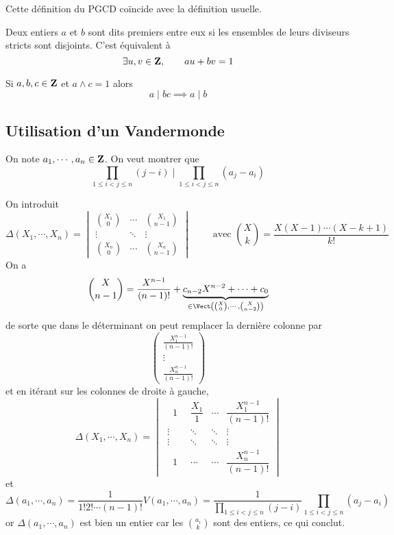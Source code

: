 \begin{rem}
    Cette définition du PGCD coïncide avec la définition usuelle.
\end{rem}

\begin{thmdef}
    Deux entiers $a$ et $b$ sont dits premiers entre eux si les ensembles de leurs diviseurs stricts sont disjoints. C'est équivalent à \[
        \exists u, v\in\mathbf Z, \qquad au+bv=1
    \]
\end{thmdef}

\begin{thm}
     Si $a, b, c\in \mathbf Z$ et $a\land c=1$ alors \[
        a\;|\;bc\implies a\;|\; b
    \]
\end{thm}

\subsection{Utilisation d'un Vandermonde}

On note $a_1, \cdots, a_n\in\mathbf Z$. On veut montrer que \[
    \prod_{1\leq i<j\leq n}(j-i)\;\Big|\; \prod_{1\leq i<j\leq n}(a_j-a_i)
\]

On introduit \[
    \Delta(X_1, \cdots, X_n)= \begin{vmatrix}
        \binom{X_1}0 & \cdots & \binom{X_1}{n-1} \\
        \vdots & \ddots & \vdots \\
        \binom{X_n}0 & \cdots & \binom{X_n}{n-1}
    \end{vmatrix}\qquad \text{ avec }\binom Xk=\frac{X(X-1)\cdots (X-k+1)}{k!}
\]
On a \[
    \binom X{n-1}=\frac{X^{n-1}}{(n-1)!}+\underbrace{c_{n-2}X^{n-2}+\cdots +c_0}_{\in \Vect \left( \binom X0, \cdots, \binom X{n-2} \right)}
\]
de sorte que dans le déterminant on peut remplacer la dernière colonne par \[
    \begin{pmatrix}
        \frac{X_1^{n-1}}{(n-1)!} \\
        \vdots \\
        \frac{X_n^{n-1}}{(n-1)!}
    \end{pmatrix}
\]
et en itérant sur les colonnes de droite à gauche, \[
    \Delta(X_1, \cdots, X_n)= \begin{vmatrix}
        \;\;\;1\;\; & \dfrac{X_1}1 & \cdots & \dfrac{X_1^{n-1}}{(n-1)!} \\
        \;\vdots & \ddots & \ddots & \vdots \\
        \;\vdots & \ddots & \ddots & \vdots \\
        \;\;\;1\;\; & \cdots & \cdots & \dfrac{X_n^{n-1}}{(n-1)!}
    \end{vmatrix}
\]
et \[
    \Delta(a_1, \cdots, a_n)=\frac1{1!2!\cdots (n-1)!}V(a_1, \cdots, a_n)=\frac1{\prod_{1\leq i<j\leq n}(j-i)}\prod_{1\leq i<j\leq n}(a_j-a_i)
\]
or $\Delta(a_1, \cdots, a_n)$ est bien un entier car les $\binom{a_i}k$ sont des entiers, ce qui conclut.

